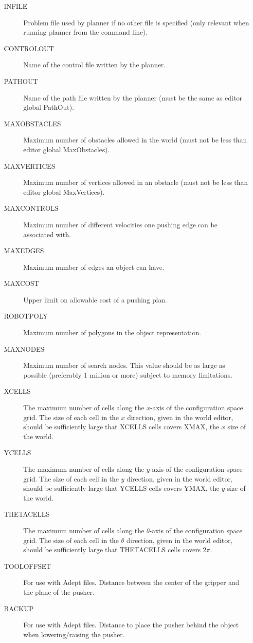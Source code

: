 \begin{description}
\item[INFILE] Problem file used by planner if no other file is specified (only relevant when running
planner from the command line).
\item[CONTROLOUT] Name of the control file written by the planner.
\item[PATHOUT] Name of the path file written by the planner (must be the same as editor global 
PathOut).
\item[MAXOBSTACLES] Maximum number of obstacles allowed in the world (must not be less than editor 
global MaxObstacles).
\item[MAXVERTICES] Maximum number of vertices allowed in an obstacle (must not be less than editor 
global MaxVertices).
\item[MAXCONTROLS] Maximum number of different velocities one pushing edge can be associated with.
\item[MAXEDGES] Maximum number of edges an object can have.
\item[MAXCOST] Upper limit on allowable cost of a pushing plan.
\item[ROBOTPOLY] Maximum number of polygons in the object representation.
\item[MAXNODES] Maximum number of search nodes.  This value should be 
as large as possible (preferably 1 million or more) subject to memory
limitations.
\item[XCELLS]  The maximum number of cells along the $x$-axis of the 
configuration space grid.  The size of each cell in the $x$ direction,
given in the world editor, should be sufficiently large that XCELLS cells
covers XMAX, the $x$ size of the world.
\item[YCELLS]  The maximum number of cells along the $y$-axis of the
configuration space grid.   The size of each cell in the $y$ direction,
given in the world editor, should be sufficiently large that YCELLS cells
covers YMAX, the $y$ size of the world.
\item[THETACELLS]  The maximum number of cells along the $\theta$-axis of the
configuration space grid.   The size of each cell in the $\theta$ direction,
given in the world editor, should be sufficiently large that THETACELLS cells
covers $2\pi$.
\item[TOOLOFFSET]  For use with Adept files.  Distance between the center of 
the gripper and the plane of the pusher.
\item[BACKUP]  For use with Adept files.  Distance to place the pusher
behind the object when lowering/raising the pusher.
\end{description}

